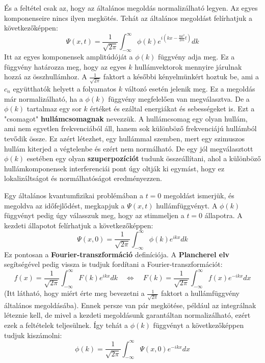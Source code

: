\documentclass[../main.tex]{subfiles}
\begin{document}
És a feltétel csak az, hogy az általános megoldás normalizálható legyen. Az egyes komponenseire nincs ilyen megkötés. Tehát az általános megoldást felírhatjuk a következőképpen:
\begin{equation}
    \boxed{\Psi(x,t) = \frac{1}{\sqrt{2 \pi}} \int_{-\infty}^{\infty} \phi(k) e^{i (kx - \frac{\hbar k^2}{2m}t)} dk}
\end{equation}
Itt az egyes komponensek amplitúdóját a $\phi(k)$ függvény adja meg. Ez a függvény határozza meg, hogy az egyes $k$ hullámvektorok mennyire járulnak hozzá az összhullámhoz.
A $\frac{1}{\sqrt{2 \pi}}$ faktort a későbbi kényelmünkért hoztuk be, ami a $c_n$ együtthatók helyett a folyamatos $k$ változó esetén jelenik meg. 
Ez a megoldás már normalizálható, ha a $\phi(k)$ függvény megfelelően van megválasztva. De a $\phi(k)$ tartalmaz egy sor $k$ értéket és ezáltal energiákat és sebességeket is.
Ezt a "csomagot" \textbf{hullámcsomagnak} nevezzük. A hullámcsomag egy olyan hullám, ami nem egyetlen frekvenciából áll, hanem sok különböző frekvenciájú hullámból tevődik össze.
Ez azért létezhet, egy hullámmal szemben, mert egy szimuszos hullám kiterjed a végtelenbe és ezért nem normálható. De egy jól megválasztott $\phi(k)$ esetében egy olyan \textbf{szuperpozíciót}
tudunk összeállítani, ahol a különböző hullámkomponensek interferenciái pont úgy oltják ki egymást, hogy ez lokalizáltságot és normálhatóságot eredményezzen.

Egy általános kvantumfizikai problémában a $t = 0$ megoldást ismerjük, és megoldva az időfejlődést, megkapjuk a $\Psi(x,t)$ hullámfüggvényt. A $\phi(k)$ függvényt pedig úgy válasszuk meg,
hogy az stimmeljen a $t = 0$ állapotra. A kezdeti állapotot felírhatjuk a következőképpen:
\begin{equation}
    \Psi(x,0) = \frac{1}{\sqrt{2 \pi}} \int_{-\infty}^{\infty} \phi(k) e^{i k x} dk
\end{equation}
Ez pontosan a \textbf{Fourier-transzformáció} definíciója. A \textbf{Plancherel elv} segítségével pedig vissza is tudjuk fordítani a Fourier-transzformációt:
\begin{equation}
    \boxed{f(x) = \frac{1}{\sqrt{2 \pi}} \int_{-\infty}^{\infty} F(k) e^{i k x} dk \quad \Longleftrightarrow \quad F(k) = \frac{1}{\sqrt{2 \pi}} \int_{-\infty}^{\infty} f(x) e^{-i k x} dx}
\end{equation}
(Itt látható, hogy miért érte meg bevezetni a $\frac{1}{\sqrt{2 \pi}}$ faktort a hullámfüggvény általános megoldásába). Ennek persze van pár megkötése, például az integrálnak léteznie kell,
de mivel a kezdeti megoldásunk garantáltan normalizálható, ezért ezek a feltételek teljesülnek. Így tehát a $\phi(k)$ függvényt a következőképpen tudjuk kiszámolni:
\begin{equation}
    \boxed{\phi(k) = \frac{1}{\sqrt{2 \pi}} \int_{-\infty}^{\infty} \Psi(x,0) e^{-i k x} dx}
\end{equation}
\end{document}
